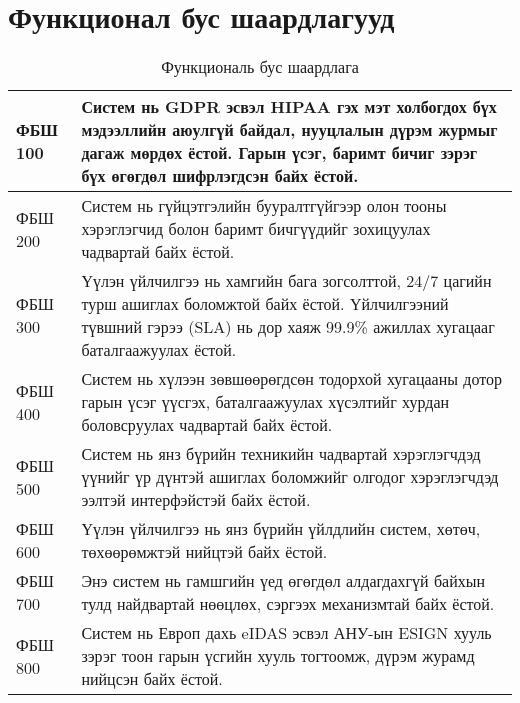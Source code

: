 \section{Функционал бус шаардлагууд}
\begin{table}[h!]
	\centering
	\begin{tabular}{ |p{2cm}|p{13cm}| }
		\hline
		ФБШ 100 & Систем нь GDPR эсвэл HIPAA гэх мэт холбогдох бүх мэдээллийн аюулгүй байдал, нууцлалын дүрэм журмыг дагаж мөрдөх ёстой. Гарын үсэг, баримт бичиг зэрэг бүх өгөгдөл шифрлэгдсэн байх ёстой. \\ \hline
		ФБШ 200 & Систем нь гүйцэтгэлийн бууралтгүйгээр олон тооны хэрэглэгчид болон баримт бичгүүдийг зохицуулах чадвартай байх ёстой. \\ \hline
		ФБШ 300 & Үүлэн үйлчилгээ нь хамгийн бага зогсолттой, 24/7 цагийн турш ашиглах боломжтой байх ёстой. Үйлчилгээний түвшний гэрээ (SLA) нь дор хаяж 99.9\% ажиллах хугацааг баталгаажуулах ёстой.     \\ \hline
		ФБШ 400 & Систем нь хүлээн зөвшөөрөгдсөн тодорхой хугацааны дотор гарын үсэг үүсгэх, баталгаажуулах хүсэлтийг хурдан боловсруулах чадвартай байх ёстой.                                             \\ \hline
		ФБШ 500 & Систем нь янз бүрийн техникийн чадвартай хэрэглэгчдэд үүнийг үр дүнтэй ашиглах боломжийг олгодог хэрэглэгчдэд ээлтэй интерфэйстэй байх ёстой.                                             \\ \hline
		ФБШ 600 & Үүлэн үйлчилгээ нь янз бүрийн үйлдлийн систем, хөтөч, төхөөрөмжтэй нийцтэй байх ёстой.                                                                                                    \\  \hline
		ФБШ 700 & Энэ систем нь гамшгийн үед өгөгдөл алдагдахгүй байхын тулд найдвартай нөөцлөх, сэргээх механизмтай байх ёстой.                                                                            \\ \hline
		ФБШ 800 & Систем нь Европ дахь eIDAS эсвэл АНУ-ын ESIGN хууль зэрэг тоон гарын үсгийн хууль тогтоомж, дүрэм журамд нийцсэн байх ёстой.                                                              \\ \hline
	\end{tabular}
   \caption{Функциональ бус шаардлага}
\end{table}

